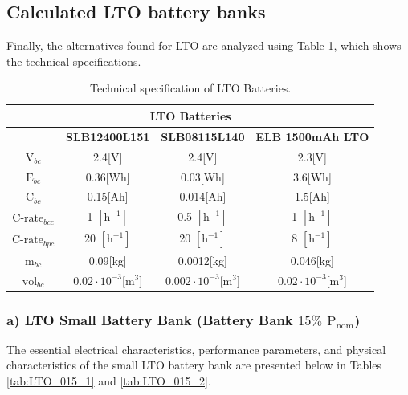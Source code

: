  

\subsection{Calculated LTO battery banks}

Finally, the alternatives found for LTO are analyzed using Table \ref{tab:Technical_inputLTO}, which shows the technical specifications.

\begin{table}[H]
	\centering
	\caption{Technical specification of LTO Batteries.}
	\label{tab:Technical_inputLTO}
	\begin{tabular}{|c|c|c|c|}
		\hline
		\multicolumn{4}{|c|}{\textbf{LTO Batteries}} \\
		\hline\hline
		 &  \textbf{SLB12400L151} & \textbf{SLB08115L140} & \textbf{ELB 1500mAh LTO}\\
		 \hline
		$\text{V}_{bc}$ & 2.4[V]  & 2.4[V] & 2.3[V] \\	
		\hline
		$\text{E}_{bc}$ &  0.36[Wh] & 0.03[Wh] & 3.6[Wh]\\	
		\hline
		$\text{C}_{bc}$ &  0.15[Ah] & 0.014[Ah] & 1.5[Ah]\\	
		\hline
		$\text{C-rate}_{bcc}$ & 1 $[\text{h}^{-1}]$  & 0.5 $[\text{h}^{-1}]$ & 1 $[\text{h}^{-1}]$\\	
		\hline
		$\text{C-rate}_{bpc}$ & 20 $[\text{h}^{-1}]$  & 20 $[\text{h}^{-1}]$ & 8 $[\text{h}^{-1}]$\\	
		\hline
		$\text{m}_{bc}$ & 0.09[kg]& 0.0012[kg] & 0.046[kg]\\	
		\hline
		$\text{vol}_{bc}$ &  $0.02\cdot{10}^{-3}$[${\text{m}}^{3}$]& $0.002\cdot{10}^{-3}$[${\text{m}}^{3}$] & $0.02\cdot{10}^{-3}$[${\text{m}}^{3}$]    \\	
		\hline
	\end{tabular}
\end{table} 


\subsubsection{a) LTO Small Battery Bank (Battery Bank $15\%$ ${\text{P}}_{\text{nom}}$)}

The essential electrical characteristics, performance parameters, and physical characteristics of the small LTO battery bank are presented below in Tables \ref{tab:LTO_015_1} and \ref{tab:LTO_015_2}.


